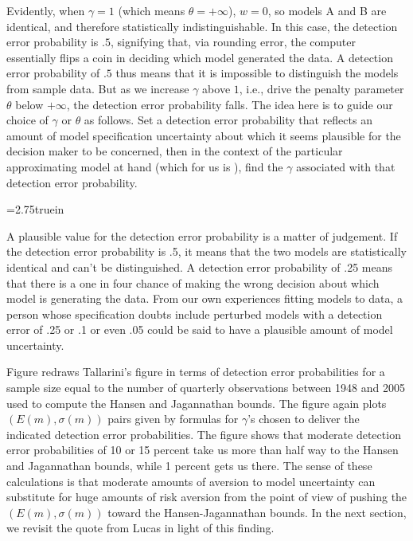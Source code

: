    Evidently, when  $\gamma=1$ (which means $\theta = + \infty$), $w = 0$, so models A and B are identical, and therefore statistically indistinguishable.
In this case, the detection error probability is $.5$, signifying that, via rounding error,  the computer essentially flips a coin in deciding which model generated the data. A detection error probability
 of $.5$ thus means that it is impossible to distinguish the models from sample data.  But as we increase $\gamma$ above $1$,
i.e., drive the penalty parameter $\theta$ below $+\infty$, the detection error probability falls.  The idea here is to guide our choice of $\gamma$ or $\theta$ as follows. Set a detection error probability that
reflects an amount of model specification uncertainty about which it seems plausible for the decision maker to be concerned, then in the context of the particular approximating model at hand
(which for us is ), find the $\gamma$ associated with that detection error probability.
%
%


\centerline{\epsfxsize=2.75truein}
\caption{Reciprocal of risk free rate, market price of risk
pairs for the random walk %
model for values of
detection error probabilities  of 50, 45, 40, 35, 30, 25, 20, 15, 10, 5 and 1 percent.}
\endfigure

A plausible value for the detection error probability is a matter of judgement. If the detection error probability is .5, it means that the two models are statistically identical and
can't be distinguished.   A detection error probability of .25 means that there is a one in four chance of making the wrong decision about which model is generating the data.
From our own experiences fitting models to data,  a person whose specification doubts include perturbed models with a  detection error of .25 or .1 or even .05  could be said to have
a plausible amount of model uncertainty.

Figure  redraws Tallarini's figure in terms of detection error probabilities for a sample size equal to the number of quarterly observations
between 1948 and 2005 used to compute the Hansen and Jagannathan bounds.  The figure again plots $(E(m), \sigma(m))$
pairs  given by formulas 
 for $\gamma$'s chosen to deliver the indicated detection error probabilities.  The figure shows that moderate detection error probabilities of
10 or 15 percent take us more than half way to the Hansen and Jagannathan bounds, while 1 percent gets us there.
The sense of these calculations is that moderate amounts of aversion to model uncertainty can substitute for huge amounts of risk aversion from the point of view of pushing the
$(E(m), \sigma(m))$ toward the Hansen-Jagannathan bounds.
In the next section, we revisit the quote from Lucas in light of this finding.

